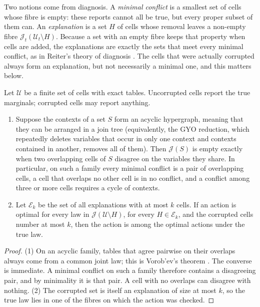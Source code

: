 \documentclass[11pt]{article}
\theoremstyle{definition}\newtheorem{definition}[theorem]{Definition}\newtheorem{remark}[theorem]{Remark}\newtheorem{example}[theorem]{Example}\newtheorem{problem}[theorem]{Open problem}\crefname{problem}{Problem}{Problems}
\begin{document}
Two notions come from diagnosis. A \emph{minimal conflict} is a smallest set of cells whose fibre is empty: these reports cannot all be true, but every proper subset of them can. An \emph{explanation} is a set $H$ of cells whose removal leaves a non-empty fibre $\mathcal J_t(\mathcal U_t\setminus H)$. Because a set with an empty fibre keeps that property when cells are added, the explanations are exactly the sets that meet every minimal conflict, as in Reiter's theory of diagnosis \cite{Reiter1987}. The cells that were actually corrupted always form an explanation, but not necessarily a minimal one, and this matters below.

\begin{proposition}\label{prop:contam}
Let $\mathcal U$ be a finite set of cells with exact tables. Uncorrupted cells report the true marginals; corrupted cells may report anything.
\begin{enumerate}
\item[(1)] Suppose the contexts of a set $S$ form an acyclic hypergraph, meaning that they can be arranged in a join tree (equivalently, the GYO reduction, which repeatedly deletes variables that occur in only one context and contexts contained in another, removes all of them). Then $\mathcal J(S)$ is empty exactly when two overlapping cells of $S$ disagree on the variables they share. In particular, on such a family every minimal conflict is a pair of overlapping cells, a cell that overlaps no other cell is in no conflict, and a conflict among three or more cells requires a cycle of contexts.
\item[(2)] Let $\mathcal E_k$ be the set of all explanations with at most $k$ cells. If an action is optimal for every law in $\mathcal J(\mathcal U\setminus H)$, for every $H\in\mathcal E_k$, and the corrupted cells number at most $k$, then the action is among the optimal actions under the true law.
\end{enumerate}
\end{proposition}

\begin{proof}
(1) On an acyclic family, tables that agree pairwise on their overlaps always come from a common joint law; this is Vorob'ev's theorem \cite{Vorobev1962}. The converse is immediate. A minimal conflict on such a family therefore contains a disagreeing pair, and by minimality it is that pair. A cell with no overlaps can disagree with nothing. (2) The corrupted set is itself an explanation of size at most $k$, so the true law lies in one of the fibres on which the action was checked.
\end{proof}
\end{document}
